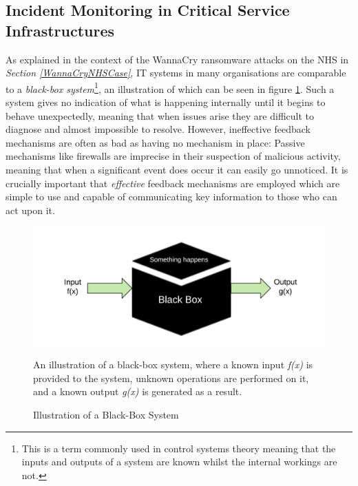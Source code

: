 \subsection{Incident Monitoring in Critical Service Infrastructures}
As explained in the context of the WannaCry ransomware attacks on the NHS in \textit{Section \ref{WannaCryNHSCase}}, IT systems in many organisations are comparable to a \textit{black-box system}\footnote{This is a term commonly used in control systems theory meaning that the inputs and outputs of a system are known whilst the internal workings are not.}, an illustration of which can be seen in figure \ref{fig:Images/black_box.png}. Such a system gives no indication of what is happening internally until it begins to behave unexpectedly, meaning that when issues arise they are difficult to diagnose and almost impossible to resolve. However, ineffective feedback mechanisms are often as bad as having no mechanism in place: Passive mechanisms like firewalls are imprecise in their suspection of malicious activity, meaning that when a significant event does occur it can easily go unnoticed. \cite{Voronkov:2017:SLR:3161158.3130876} It is crucially important that \textit{effective} feedback mechanisms are employed which are simple to use and capable of communicating key information to those who can act upon it.



\begin{figure}[ht]
      \centering
      \includegraphics[width=175mm, scale=1]{Images/black_box.png}
      \caption{Illustration of a Black-Box System} 
      \medskip
	  \small
		An illustration of a black-box system, where a known input \textit{f(x)} is provided to the system, unknown operations are performed on it, and a known output \textit{g(x)} is generated as a result.
\label{fig:Images/black_box.png}
\end{figure}


